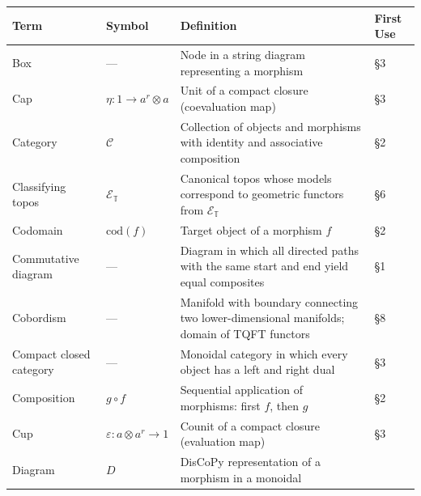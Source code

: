 \documentclass[
]{article}
\newcounter{none} %
\numberwithin{equation}{section}
\begin{document}
{\def\LTcaptype{none} %
\begin{longtable}[]{@{}
  >{\raggedright\arraybackslash}p{}
  >{\centering\arraybackslash}p{}
  >{\raggedright\arraybackslash}p{}
  >{\centering\arraybackslash}p{}@{}}
\toprule\noalign{}
\begin{minipage}[b]{\linewidth}\raggedright
Term
\end{minipage} & \begin{minipage}[b]{\linewidth}\centering
Symbol
\end{minipage} & \begin{minipage}[b]{\linewidth}\raggedright
Definition
\end{minipage} & \begin{minipage}[b]{\linewidth}\centering
First Use
\end{minipage} \\
\midrule\noalign{}
\endhead
\bottomrule\noalign{}
\endlastfoot
Box & --- & Node in a string diagram representing a morphism & §3 \\
Cap & \(\eta: 1 \to a^r \otimes a\) & Unit of a compact closure
(coevaluation map) & §3 \\
Category & \(\mathcal{C}\) & Collection of objects and morphisms with
identity and associative composition & §2 \\
Classifying topos & \(\mathcal{E}_{\mathbb{T}}\) & Canonical topos whose
models correspond to geometric functors from
\(\mathcal{E}_{\mathbb{T}}\) & §6 \\
Codomain & \(\text{cod}(f)\) & Target object of a morphism \(f\) & §2 \\
Commutative diagram & --- & Diagram in which all directed paths with the
same start and end yield equal composites & §1 \\
Cobordism & --- & Manifold with boundary connecting two
lower-dimensional manifolds; domain of TQFT functors & §8 \\
Compact closed category & --- & Monoidal category in which every object
has a left and right dual & §3 \\
Composition & \(g \circ f\) & Sequential application of morphisms: first
\(f\), then \(g\) & §2 \\
Cup & \(\varepsilon: a \otimes a^r \to 1\) & Counit of a compact closure
(evaluation map) & §3 \\
Diagram & \(D\) & DisCoPy representation of a morphism in a monoidal

\end{longtable}}
\end{document}

